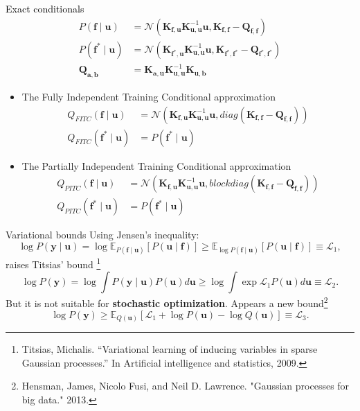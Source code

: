 \documentclass[10pt]{beamer}
\begin{document}
\begin{frame}
    \begin{alertblock}{\textcolor{black}{Exact conditionals}}
    \[
        \begin{aligned}
         P(\bm f \mid \bm u) &= \mathcal{N}(\bm K_{\bm f, \bm u}\bm K_{\bm u, \bm u}^{-1} \bm u, \bm K_{\bm f, \bm f} - \bm Q_{\bm f, \bm f} )\\
         P(\bm f^* \mid \bm u) &= \mathcal{N}(\bm K_{\bm f^*, \bm u}\bm K_{\bm u, \bm u}^{-1} \bm u, \bm K_{\bm f^*, \bm f^*} - \bm Q_{\bm f^*, \bm f^*})\\
        \bm Q_{\bm a, \bm b} &= \bm K_{\bm a, \bm u} \bm K_{\bm u, \bm u}^{-1} \bm K_{\bm u, \bm b}
        \end{aligned}
    \]
    \end{alertblock}
    \begin{itemize}
        \item The Fully Independent Training Conditional approximation 
            \[
                \begin{aligned}
                 Q_{FITC}(\bm f \mid \bm u) &= \mathcal{N}(\bm K_{\bm f, \bm u}\bm K_{\bm u, \bm u}^{-1} \bm u, diag(\bm K_{\bm f, \bm f} - \bm Q_{\bm f, \bm f}) )\\
                 Q_{FITC}(\bm f^* \mid \bm u) &= P(\bm{f}^* \mid \bm u)
                \end{aligned}
            \]
        \item The Partially Independent Training Conditional approximation
            \[
                \begin{aligned}
                 Q_{PITC}(\bm f \mid \bm u) &= \mathcal{N}(\bm K_{\bm f, \bm u}\bm K_{\bm u, \bm u}^{-1} \bm u, blockdiag(\bm K_{\bm f, \bm f} - \bm Q_{\bm f, \bm f}) )\\
                 Q_{PITC}(\bm f^* \mid \bm u) &= P(\bm{f}^* \mid \bm u)
                \end{aligned}
            \]
    \end{itemize}
\end{frame}

\begin{frame}{Variational bounds}
    Using Jensen's inequality:
    \[
         \log P(\bm y \mid \bm u) = \log \mathbb{E}_{P(\bm f \mid \bm u)}[P(\bm u \mid \bm f)] \geq  \mathbb{E}_{ \log P(\bm f \mid \bm u)}[P(\bm u \mid \bm f)] \equiv \mathcal{L}_1,
    \]
    raises Titsias' bound \footnote{Titsias, Michalis. ``Variational learning of inducing variables in sparse Gaussian processes.'' In Artificial intelligence and statistics, 2009.}
    \[
         \log P(\bm y) = \log \int P(\bm y \mid \bm u)P(\bm u) d\bm u \geq \log \int \exp \mathcal{L}_1 P(\bm u) d\bm u \equiv \mathcal{L}_2.
    \]
    But it is not suitable for \textbf{stochastic optimization}. Appears a new bound\footnote{Hensman, James, Nicolo Fusi, and Neil D. Lawrence. "Gaussian processes for big data." 2013. }
    \[
         \log P(\bm y) \geq \mathbb{E}_{Q(\bm u)}\left[\mathcal{L}_1 + \log P(\bm u) - \log Q(\bm u)\right] \equiv \mathcal{L}_3.
    \]
\end{frame}
\end{document}

